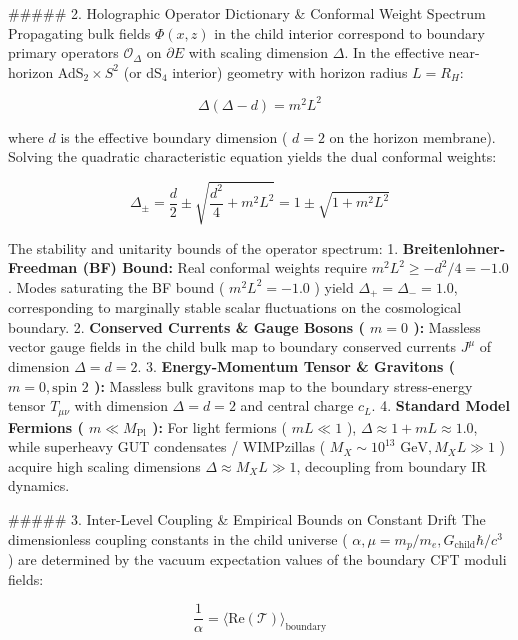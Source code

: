 \documentclass[11pt,a4paper]{article}
\theoremstyle{definition}
\theoremstyle{remark}
\begin{document}
\#\#\#\#\# 2. Holographic Operator Dictionary \& Conformal Weight Spectrum
Propagating bulk fields $\Phi(x, z)$ in the child interior correspond to boundary primary operators $\mathcal{O}_\Delta$ on $\partial E$ with scaling dimension $\Delta$. In the effective near-horizon AdS$_2 \times S^2$ (or dS$_4$ interior) geometry with horizon radius $L = R_H$:


\begin{equation}
\boxed{\Delta(\Delta - d) = m^2 L^2}
\end{equation}


where $d$ is the effective boundary dimension ( $d=2$ on the horizon membrane). Solving the quadratic characteristic equation yields the dual conformal weights:


\begin{equation}
\Delta_\pm = \frac{d}{2} \pm \sqrt{\frac{d^2}{4} + m^2 L^2} = 1 \pm \sqrt{1 + m^2 L^2}
\end{equation}


The stability and unitarity bounds of the operator spectrum:
1. \textbf{Breitenlohner-Freedman (BF) Bound:} Real conformal weights require $m^2 L^2 \ge -d^2/4 = -1.0$. Modes saturating the BF bound ( $m^2 L^2 = -1.0$ ) yield $\Delta_+ = \Delta_- = 1.0$, corresponding to marginally stable scalar fluctuations on the cosmological boundary.
2. \textbf{Conserved Currents \& Gauge Bosons ( $m = 0$ ):} Massless vector gauge fields in the child bulk map to boundary conserved currents $J^\mu$ of dimension $\Delta = d = 2$.
3. \textbf{Energy-Momentum Tensor \& Gravitons ( $m = 0, \text{spin } 2$ ):} Massless bulk gravitons map to the boundary stress-energy tensor $T_{\mu\nu}$ with dimension $\Delta = d = 2$ and central charge $c_L$.
4. \textbf{Standard Model Fermions ( $m \ll M_{\text{Pl}}$ ):} For light fermions ( $m L \ll 1$ ), $\Delta \approx 1 + m L \approx 1.0$, while superheavy GUT condensates / WIMPzillas ( $M_X \sim 10^{13}\text{ GeV}, M_X L \gg 1$ ) acquire high scaling dimensions $\Delta \approx M_X L \gg 1$, decoupling from boundary IR dynamics.

\#\#\#\#\# 3. Inter-Level Coupling \& Empirical Bounds on Constant Drift
The dimensionless coupling constants in the child universe ( $\alpha, \mu = m_p/m_e, G_{\text{child}}\hbar/c^3$ ) are determined by the vacuum expectation values of the boundary CFT moduli fields:


\begin{equation}
\frac{1}{\alpha} = \langle \text{Re}(\mathcal{T}) \rangle_{\text{boundary}}
\end{equation}
\end{document}
